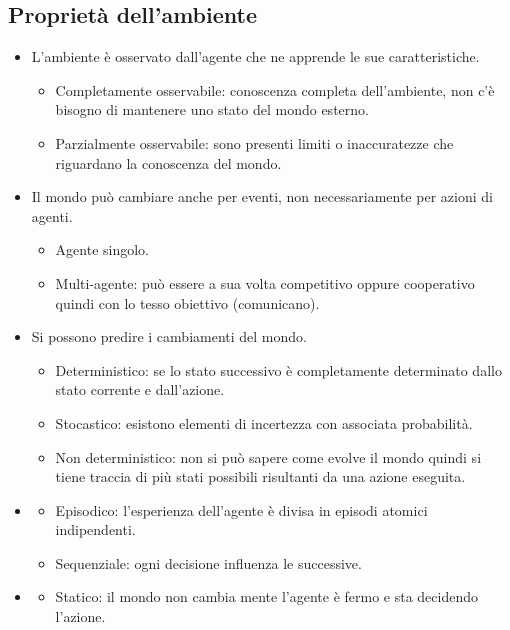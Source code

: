 \documentclass{article}
\begin{document}
\subsection{Proprietà dell'ambiente}
\begin{itemize}
    \item L'ambiente è osservato dall'agente che ne apprende le sue caratteristiche.
        \begin{itemize}
            \item Completamente osservabile: conoscenza completa dell'ambiente, non c'è bisogno di mantenere uno stato del mondo esterno.
            \item Parzialmente osservabile: sono presenti limiti o inaccuratezze che riguardano la conoscenza del mondo.
        \end{itemize}
    \item Il mondo può cambiare anche per eventi, non necessariamente per azioni di agenti.
        \begin{itemize}
            \item Agente singolo.
            \item Multi-agente: può essere a sua volta competitivo oppure cooperativo quindi con lo tesso obiettivo (comunicano).
        \end{itemize}
    \item Si possono predire i cambiamenti del mondo.
        \begin{itemize}
            \item Deterministico: se lo stato successivo è completamente determinato dallo stato corrente e dall'azione.
            \item Stocastico: esistono elementi di incertezza con associata probabilità.
            \item Non deterministico: non si può sapere come evolve il mondo quindi si tiene traccia di più stati possibili risultanti da una azione eseguita.
        \end{itemize}
    \item
        \begin{itemize}
            \item Episodico: l'esperienza dell'agente è divisa in episodi atomici indipendenti.
            \item Sequenziale: ogni decisione influenza le successive.
        \end{itemize}
    \item
        \begin{itemize}
            \item Statico: il mondo non cambia mente l'agente è fermo e sta decidendo l'azione.

\end{itemize}
\end{itemize}
\end{document}
